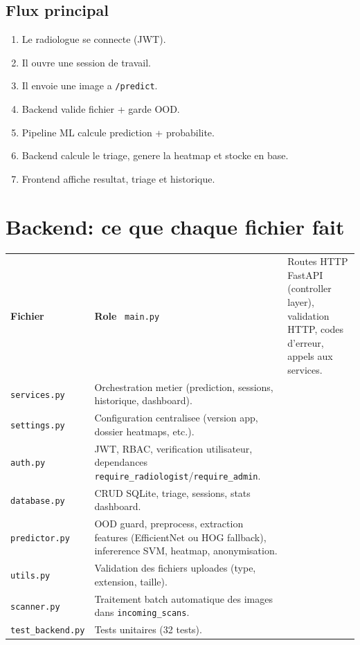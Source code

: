 \documentclass[12pt,a4paper]{article}
\begin{document}
\subsection{Flux principal}
\begin{enumerate}
  \item Le radiologue se connecte (JWT).
  \item Il ouvre une session de travail.
  \item Il envoie une image a \texttt{/predict}.
  \item Backend valide fichier + garde OOD.
  \item Pipeline ML calcule prediction + probabilite.
  \item Backend calcule le triage, genere la heatmap et stocke en base.
  \item Frontend affiche resultat, triage et historique.
\end{enumerate}

\section{Backend: ce que chaque fichier fait}
\begin{table}[h!]
\centering
\begin{tabular}{p{4cm} p{10.5cm}}
\toprule
\textbf{Fichier} & \textbf{Role}\
\midrule
\texttt{main.py} & Routes HTTP FastAPI (controller layer), validation HTTP, codes d'erreur, appels aux services. \\
\texttt{services.py} & Orchestration metier (prediction, sessions, historique, dashboard). \\
\texttt{settings.py} & Configuration centralisee (version app, dossier heatmaps, etc.). \\
\texttt{auth.py} & JWT, RBAC, verification utilisateur, dependances \texttt{require\_radiologist}/\texttt{require\_admin}. \\
\texttt{database.py} & CRUD SQLite, triage, sessions, stats dashboard. \\
\texttt{predictor.py} & OOD guard, preprocess, extraction features (EfficientNet ou HOG fallback), infererence SVM, heatmap, anonymisation. \\
\texttt{utils.py} & Validation des fichiers uploades (type, extension, taille). \\
\texttt{scanner.py} & Traitement batch automatique des images dans \texttt{incoming\_scans}. \\
\texttt{test\_backend.py} & Tests unitaires (32 tests). \\
\bottomrule
\end{tabular}
\end{table}
\end{document}
